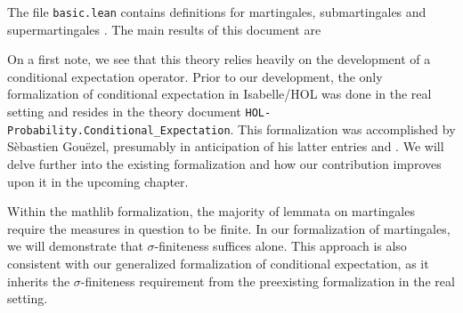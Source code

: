 The file \texttt{basic.lean} contains definitions for martingales, submartingales and supermartingales \cite{Degenne_Ying_2022}. The main results of this document are
\vspace{0.3cm}
\vspace{0.3cm}

On a first note, we see that this theory relies heavily on the development of a conditional expectation operator. Prior to our development, the only formalization of conditional expectation in Isabelle/HOL was done in the real setting and resides in the theory document \texttt{HOL-Probability.Conditional\_Expectation}. This formalization was accomplished by S\`ebastien Gou\"ezel, presumably in anticipation of his latter entries \cite{Ergodic_Theory-AFP} and \cite{Lp-AFP}. We will delve further into the existing formalization and how our contribution improves upon it in the upcoming chapter.

Within the \textsf{mathlib} formalization, the majority of lemmata on martingales require the measures in question to be finite. In our formalization of martingales, we will demonstrate that $\sigma$-finiteness suffices alone. This approach is also consistent with our generalized formalization of conditional expectation, as it inherits the $\sigma$-finiteness requirement from the preexisting formalization in the real setting.

